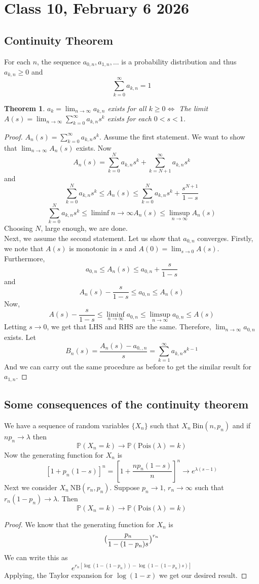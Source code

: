 \documentclass{article}
\newtheorem{theorem}{Theorem}
\begin{document}
\section*{Class 10, February 6 2026}
\subsection*{Continuity Theorem}
For each $n$, the sequence $a_{0,n},a_{1,n},\dots$ is a probability distribution and thus $a_{k,n}\geq 0$ and $$\sum_{k=0}^{\infty}a_{k,n}=1$$
\begin{theorem}
    $a_k=\lim_{n\to\infty}a_{k,n}$ exists for all $k\geq 0 \iff$ The limit $A(s)=\lim_{n\to\infty}\sum_{k=0}^{\infty}a_{k,n}s^k$ exists for each $0<s<1$.
\end{theorem}
\begin{proof}
        $A_{n}(s)=\sum_{k=0}^{\infty}a_{k,n}s^k$. Assume the first statement. We want to show that $\lim_{n\to\infty}A_{n}(s)$ exists.
        Now 
        $$A_{n}(s)=\sum_{k=0}^{N}a_{k,n}s^{k}+\sum_{k=N+1}^{\infty}a_{k,n}s^{k}$$
        and $$\sum_{k=0}^{N}a_{k,n}s^k\leq A_n(s)\leq \sum_{k=0}^{N}a_{k,n}s^k +\frac{s^{N+1}}{1-s}$$
$$\sum_{k=0}^{N}a_{k,n}s^k\leq \liminf{n\to\infty}A_{n}(s)\leq \limsup_{n\to\infty}A_{n}(s)$$
Choosing $N$, large enough, we are done.\\
Next, we assume the second statement. Let us show that $a_{0,n}$ converges. Firstly, we note that $A(s)$ is monotonic in $s$ and $A(0)=\lim_{s\to 0}A(s)$. Furthermore,
$$a_{0,n}\leq A_{n}(s)\leq a_{0,n}+\frac{s}{1-s}$$ 
and $$A_{n}(s)-\frac{s}{1-s}\leq a_{0,n}\leq A_{n}(s)$$
Now,
$$A(s)-\frac{s}{1-s}\leq \liminf_{n\to\infty}a_{0,n}\leq \limsup_{n\to\infty}a_{0,n}\leq A(s)$$
Letting $s\to 0$, we get that LHS and RHS are the same. Therefore, $\lim_{n\to\infty}a_{0,n}$ exists.
Let 
$$B_{n}(s)=\frac{A_{n}(s)-a_{0,,n}}{s}=\sum_{k=1}^{\infty}a_{k,n}s^{k-1}$$
And we can carry out the same procedure as before to get the similar result for $a_{1,n}$.
\end{proof}
\subsection*{Some consequences of the continuity theorem}
We have a sequence of random variables $\{X_n\}$ such that $X_n ~ \text{Bin}(n,p_n)$ and if $np_n\to \lambda$ then 
$$\mathbb{P}(X_n =k)\to \mathbb{P}(\text{Pois}(\lambda)=k)$$ Now the generating function for $X_n$ is 
$$[1+p_n(1-s)]^n=[1+\frac{np_n(1-s)}{n}]^n\to e^{\lambda(s-1)}$$
Next we consider $X_n ~ \text{NB}(r_n,p_n)$. Suppose $p_n\to 1$, $r_n\to\infty$ such that $r_n(1-p_n)\to \lambda$. Then $$\mathbb{P}(X_n =k)\to \mathbb{P}(\text{Pois}(\lambda)=k)$$                                                                                                                                                                                                         
\begin{proof}
    We know that the generating function for $X_n$ is 
    $$\big{(}\frac{p_n}{1-(1-p_n)s}\big{)}^{r_n}$$
        We can write this as $$e^{r_n[\log{(1-(1-p_n))}-\log{(1-(1-p_n)s)}]}$$
        Applying, the Taylor expansion for $\log{(1-x)}$ we get our desired result.

    \end{proof}
\end{document}
